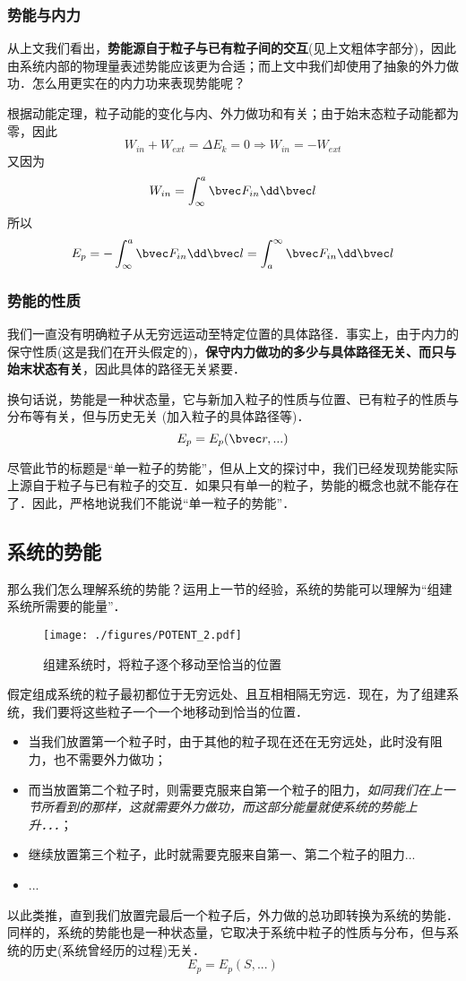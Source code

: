 \subsubsection{势能与内力}
从上文我们看出，\textbf{势能源自于粒子与已有粒子间的交互}(见上文粗体字部分)，因此由系统内部的物理量表述势能应该更为合适；而上文中我们却使用了抽象的外力做功．怎么用更实在的内力功来表现势能呢？

根据动能定理，粒子动能的变化与内、外力做功和有关；由于始末态粒子动能都为零，因此
$$W_{in} + W_{ext} = \Delta E_k = 0 \Rightarrow W_{in} = -W_{ext}$$
又因为
$$W_{in} = \int^a_\infty \bvec F_{in} \dd \bvec l $$
所以
$$E_p = - \int^a_\infty \bvec F_{in} \dd \bvec l = \int^\infty_a \bvec F_{in} \dd \bvec l$$

\subsubsection{势能的性质}
我们一直没有明确粒子从无穷远运动至特定位置的具体路径．事实上，由于内力的保守性质(这是我们在开头假定的)，\textbf{保守内力做功的多少与具体路径无关、而只与始末状态有关}，因此具体的路径无关紧要．%

换句话说，势能是一种状态量，它与新加入粒子的性质与位置、已有粒子的性质与分布等有关，但与历史无关 (加入粒子的具体路径等)．
$$E_p=E_p(\bvec r,...)$$

尽管此节的标题是“单一粒子的势能”，但从上文的探讨中，我们已经发现势能实际上源自于粒子与已有粒子的交互．如果只有单一的粒子，势能的概念也就不能存在了．因此，严格地说我们不能说“单一粒子的势能”．

\subsection{系统的势能}
那么我们怎么理解系统的势能？运用上一节的经验，系统的势能可以理解为“组建系统所需要的能量”．

\begin{figure}[ht]
\centering
\texttt{[image: ./figures/POTENT\_2.pdf]}
\caption{组建系统时，将粒子逐个移动至恰当的位置} \label{POTENT_fig2}
\end{figure}
假定组成系统的粒子最初都位于无穷远处、且互相相隔无穷远．现在，为了组建系统，我们要将这些粒子一个一个地移动到恰当的位置．

\begin{itemize}
\item 当我们放置第一个粒子时，由于其他的粒子现在还在无穷远处，此时没有阻力，也不需要外力做功；
\item 而当放置第二个粒子时，则需要克服来自第一个粒子的阻力，\textsl{如同我们在上一节所看到的那样，这就需要外力做功，而这部分能量就使系统的势能上升．．．}；
\item 继续放置第三个粒子，此时就需要克服来自第一、第二个粒子的阻力...
\item ...
\end{itemize}
以此类推，直到我们放置完最后一个粒子后，外力做的总功即转换为系统的势能．
同样的，系统的势能也是一种状态量，它取决于系统中粒子的性质与分布，但与系统的历史(系统曾经历的过程)无关．
$$E_p=E_p(S,...)$$

